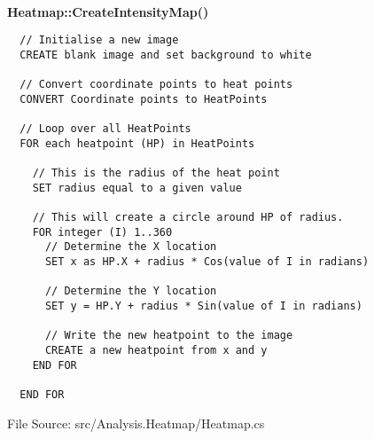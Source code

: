 ~\\
{\bfseries Heatmap::CreateIntensityMap()}
\lstset{style=pseudocode}
\begin{lstlisting}
  // Initialise a new image
  CREATE blank image and set background to white

  // Convert coordinate points to heat points
  CONVERT Coordinate points to HeatPoints

  // Loop over all HeatPoints
  FOR each heatpoint (HP) in HeatPoints
    
    // This is the radius of the heat point 
    SET radius equal to a given value

    // This will create a circle around HP of radius.
    FOR integer (I) 1..360
      // Determine the X location
      SET x as HP.X + radius * Cos(value of I in radians)

      // Determine the Y location
      SET y = HP.Y + radius * Sin(value of I in radians)

      // Write the new heatpoint to the image 
      CREATE a new heatpoint from x and y
    END FOR

  END FOR
\end{lstlisting}
{\textsf \footnotesize File Source: src/Analysis.Heatmap/Heatmap.cs }